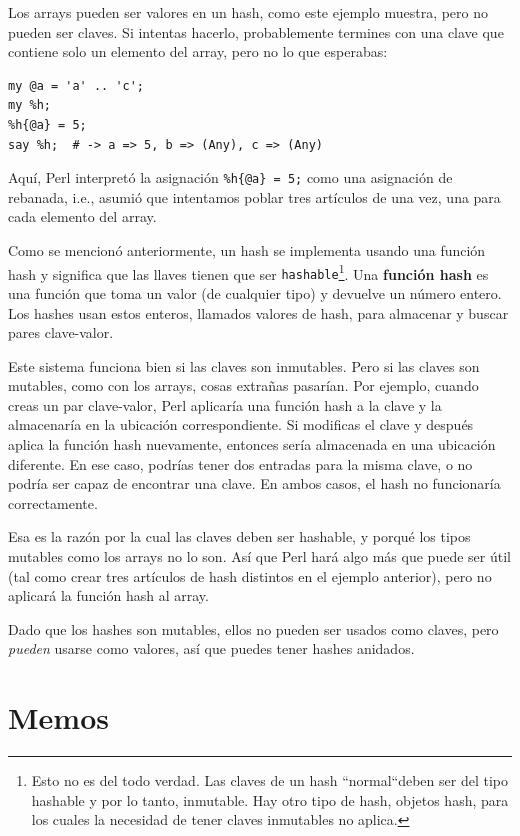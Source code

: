Los arrays pueden ser valores en un hash, como este ejemplo muestra, pero
no pueden ser claves. Si intentas hacerlo, probablemente termines con una clave
que contiene solo un elemento del array, pero no lo que esperabas:

\begin{lstlisting}
my @a = 'a' .. 'c';
my %h;
%h{@a} = 5;
say %h;  # -> a => 5, b => (Any), c => (Any)
\end{lstlisting}

Aquí, Perl interpretó la asignación \verb|%h{@a} = 5;|
como una asignación de rebanada, i.e., asumió que intentamos
poblar tres artículos de una vez, una para cada elemento del
array.


Como se mencionó anteriormente, un hash se implementa usando 
una función hash y significa que las llaves tienen
que ser {\tt hashable}\footnote{Esto no es del todo verdad.
Las claves de un hash ``normal``deben ser del tipo hashable
y por lo tanto, inmutable. Hay otro tipo de hash, objetos hash,
para los cuales la necesidad de tener claves inmutables no aplica.}.
Una {\bf función hash} es una función que toma un valor (de cualquier tipo)
y devuelve un número entero. Los hashes usan estos enteros, llamados valores
de hash, para almacenar y buscar pares clave-valor.

Este sistema funciona bien si las claves son inmutables. Pero si las claves
son mutables, como con los arrays, cosas extrañas pasarían. Por ejemplo,
cuando creas un par clave-valor, Perl aplicaría una función hash a la clave
y la almacenaría en la ubicación correspondiente. Si modificas el clave y después
aplica la función hash nuevamente, entonces sería almacenada en una ubicación
diferente. En ese caso, podrías tener dos entradas para la misma clave, o 
no podría ser capaz de encontrar una clave. En ambos casos, el hash
no funcionaría correctamente.

Esa es la razón por la cual las claves deben ser hashable, y porqué
los tipos mutables como los arrays no lo son. Así que Perl hará algo más 
que puede ser útil (tal como crear tres artículos de hash distintos en el
ejemplo anterior), pero no aplicará la función hash al array. 
  
Dado que los hashes son mutables, ellos no pueden ser usados como claves,
pero {\em pueden} usarse como valores, así que puedes tener hashes anidados.

\section{Memos}
\label{memoize}

